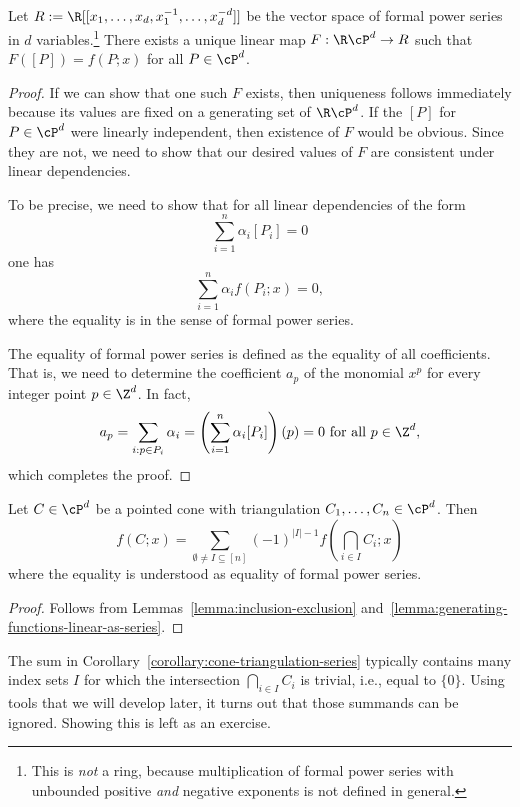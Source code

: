 \begin{lemma}
  \label{lemma:generating-functions-linear-as-series}
  Let $R := \R[[x_1,\ldots,x_d,x_1^{-1},\ldots,x_d^{-d}]]$ be the vector space of formal power series in $d$ variables.\footnote{%
  This is \emph{not} a ring, because multiplication of formal power series with unbounded positive \emph{and} negative exponents is not defined in general.}
  There exists a unique linear map $F: \R \cP^d \to R$
  such that $F([P]) = f(P;x)$ for all $P \in \cP^d$.
\end{lemma}
\begin{proof}
  If we can show that one such $F$ exists,
  then uniqueness follows immediately because its values are fixed on a generating set of $\R\cP^d$.
  If the $[P]$ for $P \in \cP^d$ were linearly independent,
  then existence of $F$ would be obvious.
  Since they are not, we need to show that our desired values of $F$ are consistent under linear dependencies.

  To be precise, we need to show that for all linear dependencies of the form
  \[
    \sum_{i=1}^n \alpha_i [P_i] = 0
  \]
  one has
  \[
    \sum_{i=1}^n \alpha_i f(P_i; x) = 0,
  \]
  where the equality is in the sense of formal power series.

  The equality of formal power series is defined as the equality of all coefficients.
  That is,
  we need to determine the coefficient $a_p$ of the monomial $x^p$
  for every integer point $p \in \Z^d$.
  In fact,
  \[
    a_p = \sum_{i: p \in P_i} \alpha_i = \left(\sum_{i=1}^n \alpha_i [P_i] \right)(p) = 0 \text{ for all } p \in \Z^d,
  \]
  which completes the proof.
\end{proof}

\begin{corollary}
  \label{corollary:cone-triangulation-series}
  Let $C \in \cP^d$ be a pointed cone with triangulation $C_1, \ldots, C_n \in \cP^d$.
  Then
  \[
    f(C;x) = \sum_{\emptyset \neq I \subseteq [n]} (-1)^{|I| - 1} f(\bigcap_{i \in I} C_i; x)
  \]
  where the equality is understood as equality of formal power series.
\end{corollary}
\begin{proof}
  Follows from Lemmas~\ref{lemma:inclusion-exclusion} and~\ref{lemma:generating-functions-linear-as-series}.
\end{proof}

The sum in Corollary~\ref{corollary:cone-triangulation-series} typically contains
many index sets $I$ for which the intersection $\bigcap_{i \in I} C_i$ is trivial,
i.e., equal to $\{ 0 \}$.
Using tools that we will develop later, it turns out that those summands can be ignored.
Showing this is left as an exercise.


